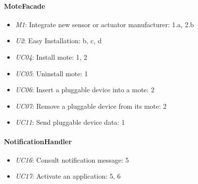     \paragraph{MoteFacade}
        \begin{itemize}
            \item \emph{M1}: Integrate new sensor or actuator manufacturer: 1.a, 2.b
            \item \emph{U2}: Easy Installation: b, c, d
            \item \emph{UC04}: Install mote: 1, 2
            \item \emph{UC05}: Uninstall mote: 1
            \item \emph{UC06}: Insert a pluggable device into a mote: 2
            \item \emph{UC07}: Remove a pluggable device from its mote: 2
            \item \emph{UC11}: Send pluggable device data: 1
        \end{itemize}

    \paragraph{NotificationHandler}
        \begin{itemize}
            \item \emph{UC16}: Consult notification message: 5
            \item \emph{UC17}: Activate an application: 5, 6
        \end{itemize}

